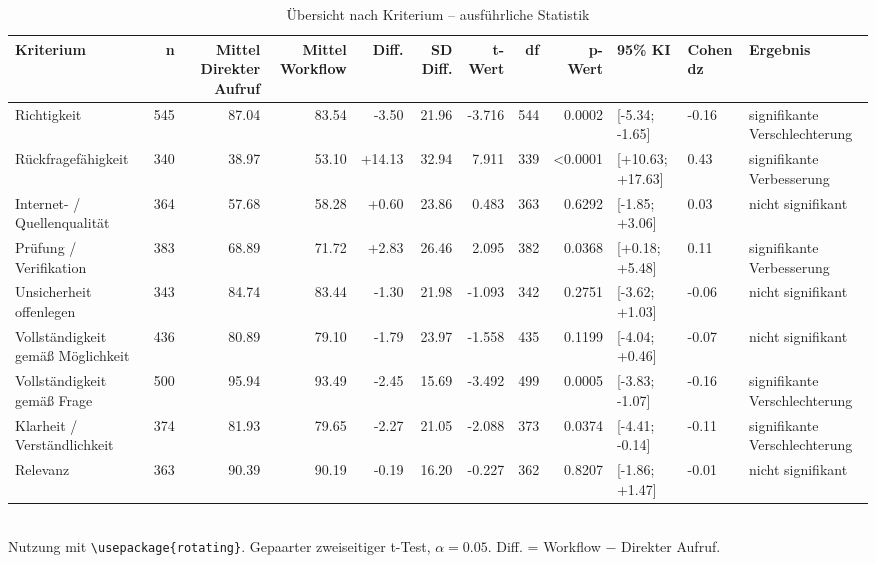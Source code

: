 \begin{table}
\centering
\caption{Übersicht nach Kriterium -- ausführliche Statistik}
\begin{tabular}{lrrrrrrrrlll}
\toprule
Kriterium & n & Mittel Direkter Aufruf & Mittel Workflow & Diff. & SD Diff. & t-Wert & df & p-Wert & 95\% KI & Cohen dz & Ergebnis \\
\midrule
Richtigkeit & 545 & 87.04 & 83.54 & -3.50 & 21.96 & -3.716 & 544 & 0.0002 & [-5.34; -1.65] & -0.16 & signifikante Verschlechterung \\
Rückfragefähigkeit & 340 & 38.97 & 53.10 & +14.13 & 32.94 & 7.911 & 339 & <0.0001 & [+10.63; +17.63] & 0.43 & signifikante Verbesserung \\
Internet- / Quellenqualität & 364 & 57.68 & 58.28 & +0.60 & 23.86 & 0.483 & 363 & 0.6292 & [-1.85; +3.06] & 0.03 & nicht signifikant \\
Prüfung / Verifikation & 383 & 68.89 & 71.72 & +2.83 & 26.46 & 2.095 & 382 & 0.0368 & [+0.18; +5.48] & 0.11 & signifikante Verbesserung \\
Unsicherheit offenlegen & 343 & 84.74 & 83.44 & -1.30 & 21.98 & -1.093 & 342 & 0.2751 & [-3.62; +1.03] & -0.06 & nicht signifikant \\
Vollständigkeit gemäß Möglichkeit & 436 & 80.89 & 79.10 & -1.79 & 23.97 & -1.558 & 435 & 0.1199 & [-4.04; +0.46] & -0.07 & nicht signifikant \\
Vollständigkeit gemäß Frage & 500 & 95.94 & 93.49 & -2.45 & 15.69 & -3.492 & 499 & 0.0005 & [-3.83; -1.07] & -0.16 & signifikante Verschlechterung \\
Klarheit / Verständlichkeit & 374 & 81.93 & 79.65 & -2.27 & 21.05 & -2.088 & 373 & 0.0374 & [-4.41; -0.14] & -0.11 & signifikante Verschlechterung \\
Relevanz & 363 & 90.39 & 90.19 & -0.19 & 16.20 & -0.227 & 362 & 0.8207 & [-1.86; +1.47] & -0.01 & nicht signifikant \\
\bottomrule
\end{tabular}
\\[2mm]
\footnotesize Nutzung mit \texttt{\textbackslash usepackage\{rotating\}}. Gepaarter zweiseitiger t-Test, $\alpha=0.05$. Diff. = Workflow $-$ Direkter Aufruf.
\end{table}
